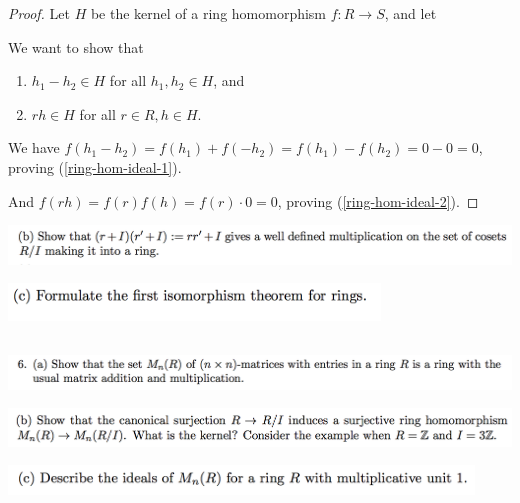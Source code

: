 \documentclass[12pt]{article}
\begin{document}
\begin{proof}
  Let $H$ be the kernel of a ring homomorphism $f:R \to S$, and let

  We want to show that
  \begin{enumerate}
  \item $h_1 - h_2 \in H$ for all $h_1, h_2 \in H$, and \label{ring-hom-ideal-1}
  \item $rh \in H$ for all $r \in R, h \in H$. \label{ring-hom-ideal-2}
  \end{enumerate}

  We have $f(h_1 - h_2) = f(h_1) + f(-h_2) = f(h_1) - f(h_2) = 0 - 0 = 0$, proving
  (\ref{ring-hom-ideal-1}).

  And $f(rh) = f(r)f(h) = f(r)\cdot 0 = 0$, proving (\ref{ring-hom-ideal-2}).

\end{proof}



\begin{mdframed}
\includegraphics[width=400pt]{img/linear-algebra-a0-1-5-b.png}\\
\end{mdframed}
\begin{mdframed}
\includegraphics[width=280pt]{img/linear-algebra-a0-1-5-c.png}\\
\end{mdframed}

\newpage
\subsection*{} %
\begin{mdframed}
\includegraphics[width=400pt]{img/linear-algebra-a0-1-6-a.png}\\
\end{mdframed}
\begin{mdframed}
\includegraphics[width=400pt]{img/linear-algebra-a0-1-6-b.png}\\
\end{mdframed}
\begin{mdframed}
\includegraphics[width=350pt]{img/linear-algebra-a0-1-6-c.png}\\
\end{mdframed}
\end{document}
